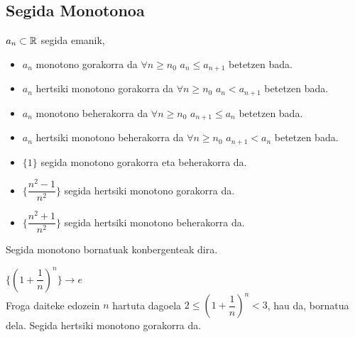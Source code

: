 \subsection{Segida Monotonoa}
\begin{definizio}
\item
${a_{n}} \subset \mathbb R$ segida emanik,
\begin{itemize}
\item
${a_{n}}$ monotono gorakorra da $\forall n \geqslant {n_{0}}$ \hspace{0.3cm} ${a_{n}} \leqslant {a_{n+1}}$ betetzen bada.
\item
${a_{n}}$ hertsiki monotono gorakorra da $\forall n \geqslant {n_{0}}$ \hspace{0.3cm} ${a_{n}}<{a_{n+1}}$ betetzen bada.
\item
${a_{n}}$ monotono beherakorra da $\forall n \geqslant {n_{0}}$ \hspace{0.3cm} ${a_{n+1}} \leqslant {a_{n}}$ betetzen bada.
\item
${a_{n}}$ hertsiki monotono beherakorra da $\forall n \geqslant {n_{0}}$ \hspace{0.3cm} ${a_{n+1}}<{a_{n}}$ betetzen bada.
\end{itemize}
\end{definizio}
\begin{adibide}
\item
\begin{itemize}
\item
$\lbrace 1 \rbrace$ segida monotono gorakorra eta beherakorra da.
\item
$\lbrace \dfrac{n^{2}-1}{n^{2}} \rbrace$ segida hertsiki monotono gorakorra da.
\item
$\lbrace \dfrac{n^{2}+1}{n^{2}} \rbrace$ segida hertsiki monotono beherakorra da.
\end{itemize}
\end{adibide}
\begin{teorema}
\item
Segida monotono bornatuak konbergenteak dira.
\end{teorema}
\begin{adibide}
\item
$\lbrace (1+\dfrac{1}{n})^{n} \rbrace \rightarrow e$\\

Froga daiteke edozein $n$ hartuta dagoela $2\leqslant(1+\dfrac{1}{n})^{n}<3$, hau da, bornatua dela. Segida hertsiki monotono gorakorra da.
\end{adibide}


